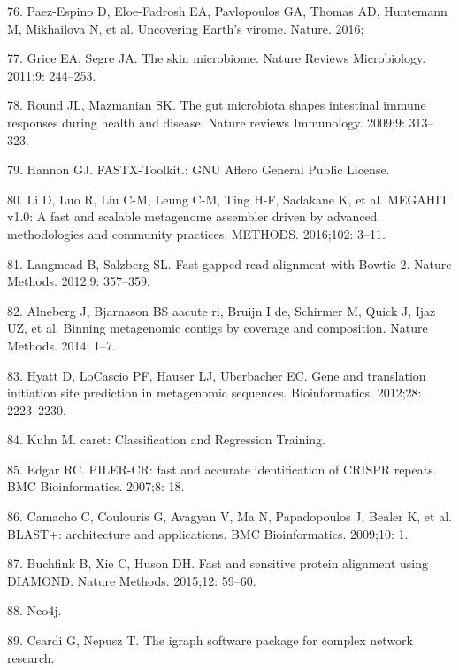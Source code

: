 \documentclass[12pt,]{article}
\begin{document}
\hypertarget{ref-PaezEspino:2016gi}{}
76. Paez-Espino D, Eloe-Fadrosh EA, Pavlopoulos GA, Thomas AD, Huntemann
M, Mikhailova N, et al. Uncovering Earth's virome. Nature. 2016;

\hypertarget{ref-Grice:2011gy}{}
77. Grice EA, Segre JA. The skin microbiome. Nature Reviews
Microbiology. 2011;9: 244--253.

\hypertarget{ref-Round:2009bz}{}
78. Round JL, Mazmanian SK. The gut microbiota shapes intestinal immune
responses during health and disease. Nature reviews Immunology. 2009;9:
313--323.

\hypertarget{ref-FASTXToolkit:wr}{}
79. Hannon GJ. FASTX-Toolkit.: GNU Affero General Public License.

\hypertarget{ref-Li:2016kd}{}
80. Li D, Luo R, Liu C-M, Leung C-M, Ting H-F, Sadakane K, et al.
MEGAHIT v1.0: A fast and scalable metagenome assembler driven by
advanced methodologies and community practices. METHODS. 2016;102:
3--11.

\hypertarget{ref-Langmead:2012jh}{}
81. Langmead B, Salzberg SL. Fast gapped-read alignment with Bowtie 2.
Nature Methods. 2012;9: 357--359.

\hypertarget{ref-Alneberg:2014fc}{}
82. Alneberg J, Bjarnason BS aacute ri, Bruijn I de, Schirmer M, Quick
J, Ijaz UZ, et al. Binning metagenomic contigs by coverage and
composition. Nature Methods. 2014; 1--7.

\hypertarget{ref-Hyatt:2012cy}{}
83. Hyatt D, LoCascio PF, Hauser LJ, Uberbacher EC. Gene and translation
initiation site prediction in metagenomic sequences. Bioinformatics.
2012;28: 2223--2230.

\hypertarget{ref-caretClassificatio:ux5fU2Litux5f1}{}
84. Kuhn M. caret: Classification and Regression Training.

\hypertarget{ref-Edgar:2007bh}{}
85. Edgar RC. PILER-CR: fast and accurate identification of CRISPR
repeats. BMC Bioinformatics. 2007;8: 18.

\hypertarget{ref-Camacho:2009fc}{}
86. Camacho C, Coulouris G, Avagyan V, Ma N, Papadopoulos J, Bealer K,
et al. BLAST+: architecture and applications. BMC Bioinformatics.
2009;10: 1.

\hypertarget{ref-Buchfink:2015ki}{}
87. Buchfink B, Xie C, Huson DH. Fast and sensitive protein alignment
using DIAMOND. Nature Methods. 2015;12: 59--60.

\hypertarget{ref-Neoj:Fuwr6PBN}{}
88. Neo4j.

\hypertarget{ref-Theigraphsoftware:vh}{}
89. Csardi G, Nepusz T. The igraph software package for complex network
research.
\end{document}
